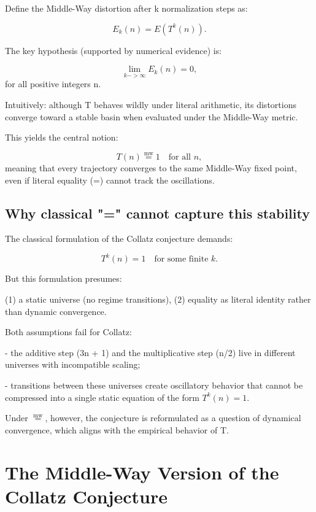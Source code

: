 \documentclass[11pt]{article}
\newcommand{\mweq}{\mathrel{\overset{\mathrm{mw}}{=}}}
\theoremstyle{definition}
\theoremstyle{remark}
\begin{document}
Define the Middle-Way distortion after k normalization steps as:

\[
  E_k(n) = E(T^k(n)).
\]

The key hypothesis (supported by numerical evidence) is:

\[
  \lim_{k->\infty} E_k(n) = 0,
\]
for all positive integers n.

Intuitively: although T behaves wildly under literal arithmetic,
its distortions converge toward a stable basin when evaluated under the
Middle-Way metric.

This yields the central notion:

\[
  T(n) \mweq 1
  \quad \text{for all } n,
\]
meaning that every trajectory converges to the same Middle-Way fixed
point, even if literal equality (=) cannot track the oscillations.

\subsection{Why classical "=" cannot capture this stability}

The classical formulation of the Collatz conjecture demands:

\[
  T^k(n) = 1 \quad \text{for some finite } k.
\]

But this formulation presumes:

(1) a static universe (no regime transitions),  
(2) equality as literal identity rather than dynamic convergence.

Both assumptions fail for Collatz:

- the additive step (3n + 1) and the multiplicative step (n/2) live in
  different universes with incompatible scaling;

- transitions between these universes create oscillatory behavior that
  cannot be compressed into a single static equation of the form
  $T^k(n) = 1$.

Under $\mweq$, however, the conjecture is reformulated as a question of
dynamical convergence, which aligns with the empirical behavior of T.


\section{The Middle-Way Version of the Collatz Conjecture}
\end{document}
